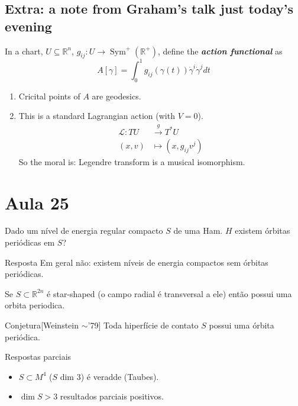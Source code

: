 \subsection{Extra: a note from Graham's talk just today's evening}

In a chart, $U\subseteq \mathbb{R}^{n}$, $g_{ij}:U \to \operatorname{Sym}^+(\mathbb{R}^{+})$, define the \textit{\textbf{action functional}} as
\[A[\gamma]=\int_{0}^1g_{ij}(\gamma(t))\dot{\gamma}^i \dot{\gamma}^jdt\]
\begin{enumerate}[label=(\roman*)]
\item Cricital points of $A$ are geodesics.
\item This is a standard Lagrangian action (with $V=0$).
	 \begin{align*}
		\mathcal{L}: TU &\overset{g}{\longrightarrow} T^*U \\
		(x,v)&\longmapsto (x,g_{ij}v^j)
	\end{align*}
	So the moral is: Legendre transform is a musical isomorphism.
\end{enumerate}

\section{Aula 25}

\begin{question}\leavevmode
	Dado um nível de energia regular compacto $S$ de uma Ham. $H$ existem órbitas periódicas em $S$?
\end{question}

\begin{thing4}{Resposta}\leavevmode
	Em geral não: existem níveis de energia compactos sem órbitas periódicas.
\end{thing4}

\begin{thm}[Rabinowitz, '78]\leavevmode
	Se $S\subset\mathbb{R}^{2n}$ é star-shaped (o campo radial é transversal a ele) então possui uma orbita periodica.
\end{thm}

\begin{thing4}{Conjetura}[Weinstein $\sim$'79]\leavevmode
Toda hiperfície de contato $S$ possui uma órbita periódica.	
\end{thing4}

\begin{thing3}{Respostas parciais}\leavevmode
\begin{itemize}
\item $S\subset M^4$ ($S$ dim 3) é veradde (Taubes).
\item $\dim S>3$ resultados parciais positivos. 
\end{itemize}
\end{thing3}

